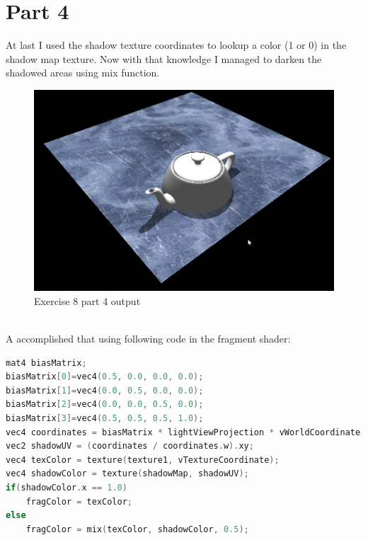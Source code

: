 \section{Part 4}
At last I used the shadow texture coordinates to lookup a color (1 or 0) in the shadow map texture.
Now with that knowledge I managed to darken the shadowed areas using mix function. 
\begin{figure}[ht!]
	\begin{center}
		\includegraphics[width=1.0\textwidth]{figures/exercise_8_2}
	\end{center}
	\vspace{-4.5ex}\caption{Exercise 8 part 4 output}
	\label{fig:exercise_8_2} 
\end{figure} \\
A accomplished that using following code in the fragment shader:
\begin{lstlisting}[language=cpp, caption={Fragment shader - in main()}]
mat4 biasMatrix;
biasMatrix[0]=vec4(0.5, 0.0, 0.0, 0.0);
biasMatrix[1]=vec4(0.0, 0.5, 0.0, 0.0);
biasMatrix[2]=vec4(0.0, 0.0, 0.5, 0.0);
biasMatrix[3]=vec4(0.5, 0.5, 0.5, 1.0);
vec4 coordinates = biasMatrix * lightViewProjection * vWorldCoordinate;
vec2 shadowUV = (coordinates / coordinates.w).xy;
vec4 texColor = texture(texture1, vTextureCoordinate);
vec4 shadowColor = texture(shadowMap, shadowUV);
if(shadowColor.x == 1.0)
	fragColor = texColor;
else
	fragColor = mix(texColor, shadowColor, 0.5);
\end{lstlisting}